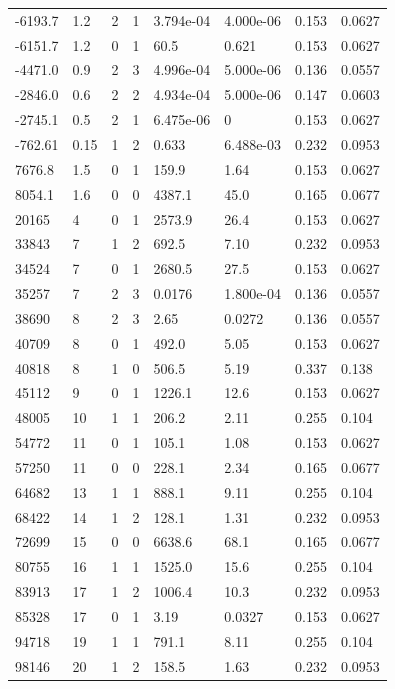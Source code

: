 \documentclass[preview]{standalone}
\begin{document}
{{\begin{tabular}{L{1.2cm}C{1.2cm} C{0.3cm}C{0.5cm} C{1.4cm}C{1.4cm} C{1.4cm}C{1.4cm}}
  -6193.7  &   1.2  & 2     &  1 &  3.794e-04  & 4.000e-06  & 0.153 &  0.0627   \\ 
  -6151.7  &   1.2  & 0     &  1 &  60.5  & 0.621  & 0.153 &  0.0627   \\ 
  -4471.0  &   0.9  & 2     &  3 &  4.996e-04  & 5.000e-06  & 0.136 &  0.0557   \\ 
  -2846.0  &   0.6  & 2     &  2 &  4.934e-04  & 5.000e-06  & 0.147 &  0.0603   \\ 
  -2745.1  &   0.5  & 2     &  1 &  6.475e-06  & 0  & 0.153 &  0.0627   \\ 
  -762.61  &  0.15  & 1     &  2 &  0.633  & 6.488e-03  & 0.232 &  0.0953   \\ 
  7676.8  &   1.5  & 0     &  1 &  159.9  & 1.64  & 0.153 &  0.0627   \\ 
  8054.1  &   1.6  & 0     &  0 &  4387.1  & 45.0  & 0.165 &  0.0677   \\ 
  20165  &     4  & 0     &  1 &  2573.9  & 26.4  & 0.153 &  0.0627   \\ 
  33843  &     7  & 1     &  2 &  692.5  & 7.10  & 0.232 &  0.0953   \\ 
  34524  &     7  & 0     &  1 &  2680.5  & 27.5  & 0.153 &  0.0627   \\ 
  35257  &     7  & 2     &  3 &  0.0176  & 1.800e-04  & 0.136 &  0.0557   \\ 
  38690  &     8  & 2     &  3 &  2.65  & 0.0272  & 0.136 &  0.0557   \\ 
  40709  &     8  & 0     &  1 &  492.0  & 5.05  & 0.153 &  0.0627   \\ 
  40818  &     8  & 1     &  0 &  506.5  & 5.19  & 0.337 &  0.138   \\ 
  45112  &     9  & 0     &  1 &  1226.1  & 12.6  & 0.153 &  0.0627   \\ 
  48005  &    10  & 1     &  1 &  206.2  & 2.11  & 0.255 &  0.104   \\ 
  54772  &    11  & 0     &  1 &  105.1  & 1.08  & 0.153 &  0.0627   \\ 
  57250  &    11  & 0     &  0 &  228.1  & 2.34  & 0.165 &  0.0677   \\ 
  64682  &    13  & 1     &  1 &  888.1  & 9.11  & 0.255 &  0.104   \\ 
  68422  &    14  & 1     &  2 &  128.1  & 1.31  & 0.232 &  0.0953   \\ 
  72699  &    15  & 0     &  0 &  6638.6  & 68.1  & 0.165 &  0.0677   \\ 
  80755  &    16  & 1     &  1 &  1525.0  & 15.6  & 0.255 &  0.104   \\ 
  83913  &    17  & 1     &  2 &  1006.4  & 10.3  & 0.232 &  0.0953   \\ 
  85328  &    17  & 0     &  1 &  3.19  & 0.0327  & 0.153 &  0.0627   \\ 
  94718  &    19  & 1     &  1 &  791.1  & 8.11  & 0.255 &  0.104   \\ 
  98146  &    20  & 1     &  2 &  158.5  & 1.63  & 0.232 &  0.0953   \\ 
\hline 
\end{tabular} 

}}
\end{document}
